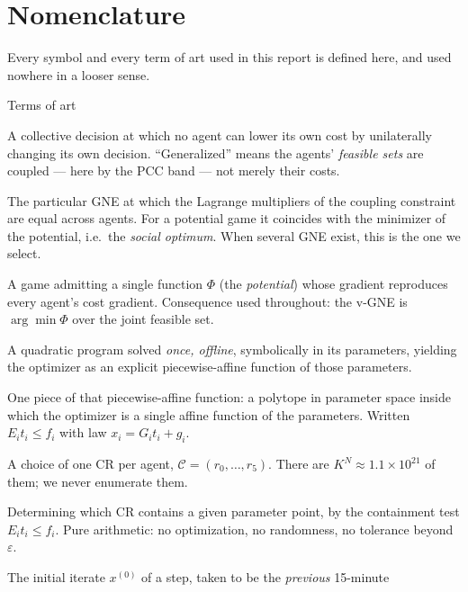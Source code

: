 \documentclass[11pt, letterpaper]{article}
\begin{document}
\section{Nomenclature}\label{sec:nomen}
Every symbol and every term of art used in this report is defined here, and used nowhere in a looser
sense.

\begin{keybox}{Terms of art}
\begin{description}[leftmargin=0pt,labelindent=0pt,style=nextline,nosep,itemsep=2pt]
\item[Generalized Nash equilibrium (GNE)] A collective decision at which no agent can lower its own
cost by unilaterally changing its own decision. ``Generalized'' means the agents' \emph{feasible sets}
are coupled --- here by the PCC band --- not merely their costs.
\item[Variational GNE (v-GNE)] The particular GNE at which the Lagrange multipliers of the coupling
constraint are equal across agents. For a potential game it coincides with the minimizer of the
potential, i.e.\ the \emph{social optimum}. When several GNE exist, this is the one we select.
\item[Potential game] A game admitting a single function $\Phi$ (the \emph{potential}) whose gradient
reproduces every agent's cost gradient. Consequence used throughout: the v-GNE is
$\arg\min\Phi$ over the joint feasible set.
\item[Multiparametric QP (mpQP)] A quadratic program solved \emph{once, offline}, symbolically in its
parameters, yielding the optimizer as an explicit piecewise-affine function of those parameters.
\item[Critical region (CR)] One piece of that piecewise-affine function: a polytope in parameter space
inside which the optimizer is a single affine function of the parameters. Written $E_it_i\le f_i$
with law $x_i=G_it_i+g_i$.
\item[Combination] A choice of one CR per agent, $\mathcal C=(r_0,\dots,r_5)$. There are
$K^N\approx1.1\times10^{21}$ of them; we never enumerate them.
\item[Point location] Determining which CR contains a given parameter point, by the containment test
$E_it_i\le f_i$. Pure arithmetic: no optimization, no randomness, no tolerance beyond $\varepsilon$.
\item[Warm start] The initial iterate $x^{(0)}$ of a step, taken to be the \emph{previous} 15-minute

\end{description}
\end{keybox}
\end{document}
